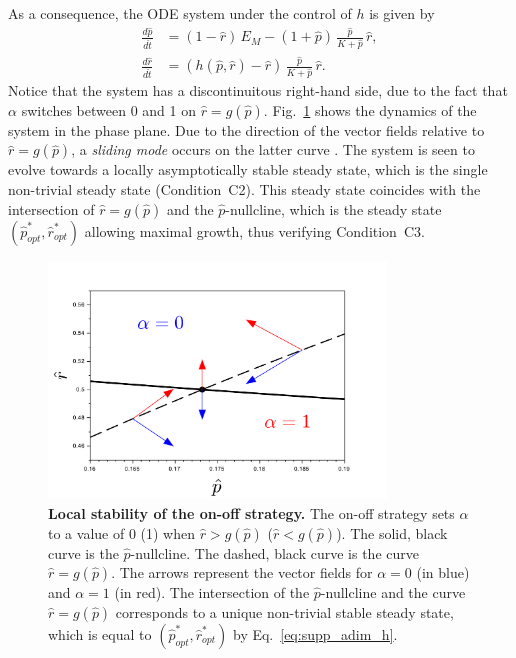 As a consequence, the ODE system under the control of $h$ is given by
\begin{equation}
\label{eq:supp_adim_h}
\begin{aligned}
\frac{d\hat{p}}{d\hat{t}} &= (1-\hat{r})\, E_M - (1 + \hat{p}) \, \frac{\hat{p}}{K + \hat{p}}\, \hat{r},\\
\frac{d\hat{r}}{d\hat{t}} &= \left(h(\hat{p}, \hat{r}) - \hat{r} \right) \, \frac{\hat{p}}{K + \hat{p}}\, \hat{r}.
\end{aligned}
\end{equation}
Notice that the system has a discontinuitous right-hand side, due to the fact that $\alpha$ switches between 0 and 1 on $\hat{r}=g(\hat{p})$. 
Fig.~\ref{fig:sliding} shows the dynamics of the system in the phase plane.
Due to the direction of the vector fields relative to $\hat{r}=g(\hat{p})$, a \textit{sliding mode} occurs on the latter curve \cite{filippov_differential_1988}.  
The system is seen to evolve towards a locally asymptotically stable steady state, which is the single non-trivial steady state (Condition~C2). 
This steady state coincides with the intersection of $\hat{r}=g(\hat{p})$ and the $\hat{p}$-nullcline, which is the steady state $(\hat{p}_{opt}^*, \hat{r}_{opt}^*)$ allowing maximal growth, thus verifying Condition~C3.

\begin{figure}[tb]
\centering
\includegraphics[width=0.8\textwidth]{Fig/Fig_sliding}
\caption
{
\textbf{Local stability of the on-off strategy.}
The on-off strategy sets $\alpha$ to a value of 0 (1) when $\hat{r} > g(\hat{p})$ ($\hat{r} < g(\hat{p})$).
The solid, black curve is the $\hat{p}$-nullcline.
The dashed, black curve is the curve $\hat{r}=g(\hat{p})$.
The arrows represent the vector fields for $\alpha=0$ (in blue) and $\alpha=1$ (in red).
The intersection of the $\hat{p}$-nullcline and the curve $\hat{r}=g(\hat{p})$ corresponds to a unique non-trivial stable steady state, which is equal to $(\hat{p}_{opt}^*, \hat{r}_{opt}^*)$ by Eq.~\ref{eq:supp_adim_h}.
}
\label{fig:sliding}
\end{figure}

